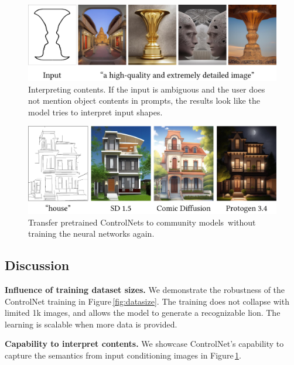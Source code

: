 \documentclass[10pt,twocolumn,letterpaper]{article}
\def\para#1{\vspace{0.25em}\noindent\textbf{#1}}
\begin{document}
	\begin{figure}
		\includegraphics[width=\linewidth]{./imgs/guess.pdf}
		\vspace{-18pt}
		\caption{Interpreting contents. If the input is ambiguous and the user does not mention object contents in prompts, the results look like the model tries to interpret input shapes.}
		\vspace{-7pt}
		\label{fig:guess}
	\end{figure}
	
	\begin{figure}[!t]
		\includegraphics[width=\linewidth]{./imgs/trans.pdf}
		\vspace{-18pt}
		\caption{Transfer pretrained ControlNets to community models\,\cite{protogen,comicdiff} without training the neural networks again.}
		\vspace{-1pt}
		\label{fig:trans}
		\vspace{-10pt}
	\end{figure}
	
	\subsection{Discussion}
	
	\para{Influence of training dataset sizes.}
	We demonstrate the robustness of the ControlNet training in Figure\,\ref{fig:datasize}.
	The training does not collapse with limited 1k images, and allows the model to generate a recognizable lion.
	The learning is scalable when more data is provided.
	
	\para{Capability to interpret contents.}
	We showcase ControlNet's capability to capture the semantics from input conditioning images in Figure\,\ref{fig:guess}.
	
\end{document}
